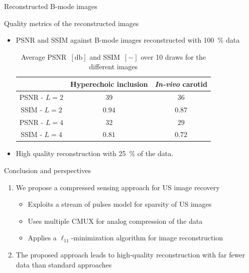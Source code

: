 {\begin{block}{Reconstructed B-mode images}
\end{block}
\vfill
\begin{block}{Quality metrics of the reconstructed images}
	\begin{itemize}
		\item PSNR and SSIM against B-mode images reconstructed with \SI{100}{\percent} data
	\begin{table}[htb]
		\caption{Average PSNR~$\left[\si{\decibel}\right]$ and SSIM~$\left[-\right]$ over \num{10} draws for the different images}
		\label{tab:SNR_SSIM}
		\centering
		\begin{tabular}{|c |c c|}
			\hline
			& Hyperechoic inclusion & \textit{In-vivo} carotid\\
			\hline
			PSNR - $L = 2$ & $39$ & $36$\\
			SSIM - $L = 2$ & $0.94$ & $0.87$\\
			PSNR - $L = 4$ & $32$ & $29$ \\
			SSIM - $L = 4$ & $0.81$ & $0.72$\\
			\hline
		\end{tabular}
	\end{table} 
		\item High quality reconstruction with \SI{25}{\percent} of the data.
	\end{itemize}
\end{block}
\vfill
\begin{block}{Conclusion and perspectives}
	\begin{enumerate}
		\item We propose a compressed sensing approach for US image recovery
		\begin{itemize}
			\item Exploits a stream of pulses model for sparsity of US images
			\item Uses multiple CMUX for analog compression of the data
			\item Applies a $\ell_{11}$-minimization algorithm for image reconstruction
		\end{itemize}
		\item The proposed approach leads to high-quality reconstruction with far fewer data than standard approaches

\end{enumerate}
\end{block}}
